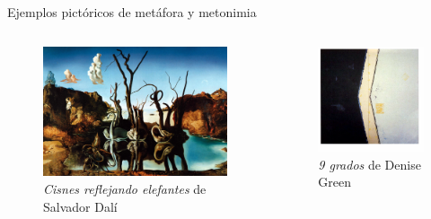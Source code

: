 \documentclass[presentation]{beamer}
\begin{document}
\begin{frame}[label={sec:org545faa0}]{Ejemplos pictóricos de metáfora y metonimia}
\begin{columns}
\begin{column}{0.48\columnwidth}
   \begin{figure}
  \caption{\emph{Cisnes reflejando elefantes} de Salvador Dalí}
\includegraphics[width=\textwidth]{./assets/arte_dali.jpg}

   \end{figure}
\end{column}

\begin{column}{0.48\columnwidth}
\begin{figure}
    \includegraphics[width=\textwidth]{./assets/arte_green.png}
\caption{\emph{9 grados} de Denise Green}
 \end{figure}
\end{column}
\end{columns}
\end{frame}
\end{document}
